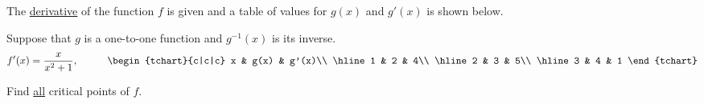 \documentclass{ximera}
\author{Gregory Hartman \and Matthew Carr}
\begin{document}
\begin{exercise}



The \underline{derivative} of the function $f$ is given and a table of values for $g(x)$ and $g'(x)$ is shown below.

Suppose that $g$ is a one-to-one function and $g^{-1}(x)$ is its inverse.
\[
f'(x)=\frac{x}{x^2+1},\hskip 1cm
\begin{tchart}{c|c|c}
x & g(x) & g'(x)\\ \hline
1 & 2 & 4\\ \hline
2 & 3 & 5\\ \hline
3 & 4 & 1
\end{tchart}
\]

Find \underline{all} critical points of $f$.
\begin{prompt}
\begin{multipleChoice}
\end{multipleChoice}
\end{prompt}

\end{exercise}
\end{document}
